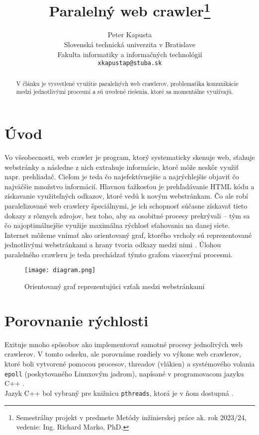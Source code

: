 \documentclass[10pt,twoside,slovak,a4paper]{article}
\title{Paralelný web crawler\thanks{Semestrálny projekt v predmete Metódy inžinierskej práce ak. rok 2023/24, vedenie: Ing. Richard Marko, PhD.}}
\author{Peter Kapusta \\
	\small Slovenská technická univerzita v Bratislave \\
	\small Fakulta informatiky a informačných technológií \\
	\small \texttt{xkapustap@stuba.sk}
}
\begin{document}
\maketitle

\begin{abstract}
V článku je vysvetlené využitie paralelných web crawlerov, problematika komunikácie medzi jednotlivými procesmi a sú uvedené riešenia, ktoré sa momentálne využívajú.
\end{abstract}

\section{Úvod}

Vo všeobecnosti, web crawler je program, ktorý systematicky skenuje web, sťahuje webstránky a následne z nich extrahuje informácie, ktoré môže neskôr využiť napr. prehliadač. Cieľom je teda čo najefektívnejšie a najrýchlejšie objaviť čo najväčšie množstvo informácií. Hlavnou ťažkosťou je prehľadávanie HTML kódu a získavanie využiteľných odkazov, ktoré vedú k novým webstránkam. Čo ale robí paralelizované web crawlery špeciálnymi, je ich schopnosť súčasne získavať tieto dokazy z rôznych zdrojov, bez toho, aby sa osobitné procesy prekrývali – tým sa čo najoptimálnejšie využije maximálna rýchlosť sťahovania na danej siete. Internet môžeme vnímať ako orientovaný graf, ktorého vrcholy sú reprezentované jednotlivými webstránkami a hrany tvoria odkazy medzi nimi \cite{7148493}. Úlohou paralelného crawleru je teda prechádzať týmto grafom viacerými procesmi.

\newpage

\begin{figure}
	\centering
	\texttt{[image: diagram.png]}
	\caption{Orientovaný graf reprezentujúci vzťah medzi webstránkami}
\end{figure}

\section{Porovnanie rýchlosti}
Exituje mnoho spôsobov ako implementovať samotné procesy jednolivých web crawlerov. V tomto odseku, ale porovnáme rozdiely vo výkone web crawlerov, ktoré boli vytvorené pomocou procesov, threadov (vlákien) a systémového volania \texttt{epoll} (poskytovaného Linuxovým jadrom), napísané v programovacom jazyku C++ \cite{9648837}. \\

Jazyk C++ bol vybraný pre knižnicu \texttt{pthreads}, ktorá je v ňom dostupná \cite{9648837}. 
\end{document}
